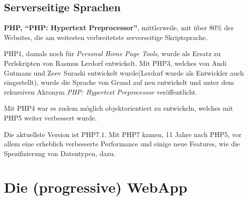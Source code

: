 \documentclass[a4paper,12pt,ngerman,listof=numbered]{scrartcl}      %
\let\oldcite\cite
\renewcommand{\cite}[1]{\textsuperscript{\oldcite{#1}}}
\newcommand{\spacer}{\par\bigskip\noindent}
\begin{document}
	\subsection{Serverseitige Sprachen}
	
	\spacer\textbf{PHP, ``PHP: Hypertext Preprocessor''}, mittlerweile, mit über 80\% der Websites, die am weitesten verbreitetste serverseitige Skriptsprache.\cite{phpCoverage}\par
	PHP1, damals noch für \emph{Personal Home Page Tools}, wurde als Ersatz zu Perlskripten von Rasmus Lerdorf entwickelt. Mit PHP3, welches von Andi Gutmans und Zeev Suraski entwickelt wurde(Lerdorf wurde als Entwickler auch eingestellt), wurde die Sprache von Grund auf neu entwickelt und unter dem rekursiven Akronym \emph{PHP: Hypertext Preprocessor} veröffentlicht.\par
	Mit PHP4 war es zudem möglich objektorientiert zu entwickeln, welches mit PHP5 weiter verbessert wurde.\par
	Die aktuellste Version ist PHP7.1. Mit PHP7 kamen, 11 Jahre nach PHP5, vor allem eine erheblich verbesserte Performance und einige neue Features, wie die Spezifizierung von Datentypen, dazu.\cite{phpWiki}\par
	
	\section{Die (progressive) WebApp}
\end{document}

